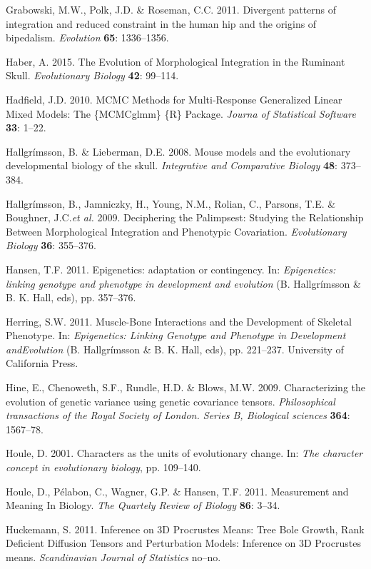 \documentclass[12pt,twoside]{report}
\begin{document}
Grabowski, M.W., Polk, J.D. \& Roseman, C.C. 2011. Divergent patterns of
integration and reduced constraint in the human hip and the origins of
bipedalism. \emph{Evolution} \textbf{65}: 1336--1356.

Haber, A. 2015. The Evolution of Morphological Integration in the
Ruminant Skull. \emph{Evolutionary Biology} \textbf{42}: 99--114.

Hadfield, J.D. 2010. MCMC Methods for Multi-Response Generalized Linear
Mixed Models: The \{MCMCglmm\} \{R\} Package. \emph{Journa of
Statistical Software} \textbf{33}: 1--22.

Hallgrímsson, B. \& Lieberman, D.E. 2008. Mouse models and the
evolutionary developmental biology of the skull. \emph{Integrative and
Comparative Biology} \textbf{48}: 373--384.

Hallgrímsson, B., Jamniczky, H., Young, N.M., Rolian, C., Parsons, T.E.
\& Boughner, J.C.\emph{et al.} 2009. Deciphering the Palimpsest:
Studying the Relationship Between Morphological Integration and
Phenotypic Covariation. \emph{Evolutionary Biology} \textbf{36}:
355--376.

Hansen, T.F. 2011. Epigenetics: adaptation or contingency. In:
\emph{Epigenetics: linking genotype and phenotype in development and
evolution} (B. Hallgrímsson \& B. K. Hall, eds), pp. 357--376.

Herring, S.W. 2011. Muscle-Bone Interactions and the Development of
Skeletal Phenotype. In: \emph{Epigenetics: Linking Genotype and
Phenotype in Development andEvolution} (B. Hallgrímsson \& B. K. Hall,
eds), pp. 221--237. University of California Press.

Hine, E., Chenoweth, S.F., Rundle, H.D. \& Blows, M.W. 2009.
Characterizing the evolution of genetic variance using genetic
covariance tensors. \emph{Philosophical transactions of the Royal
Society of London. Series B, Biological sciences} \textbf{364}:
1567--78.

Houle, D. 2001. Characters as the units of evolutionary change. In:
\emph{The character concept in evolutionary biology}, pp. 109--140.

Houle, D., Pélabon, C., Wagner, G.P. \& Hansen, T.F. 2011. Measurement
and Meaning In Biology. \emph{The Quartely Review of Biology}
\textbf{86}: 3--34.

Huckemann, S. 2011. Inference on 3D Procrustes Means: Tree Bole Growth,
Rank Deficient Diffusion Tensors and Perturbation Models: Inference on
3D Procrustes means. \emph{Scandinavian Journal of Statistics} no--no.
\end{document}
